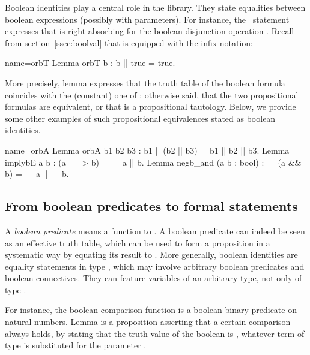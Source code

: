 Boolean identities play a central role in the \mcbMC{} library. They
state equalities between boolean expressions (possibly with parameters).
For
instance, the~ statement expresses that  is right absorbing
for the boolean disjunction operation . Recall from
section~\ref{ssec:boolval} that  is equipped with the \C{||}
infix notation:

\begin{coq}{name=orbT}{}
Lemma orbT b : b || true = true.
\end{coq}

More precisely, lemma 
expresses that the truth table of the boolean formula 
coincides with the (constant) one of : otherwise said, that the
two propositional formulas are equivalent, or that  is a
propositional tautology. Below, we provide some other examples of such
propositional equivalences stated as boolean identities.

\begin{coq}{name=orbA}{}
Lemma orbA b1 b2 b3 : b1 || (b2 || b3) = b1 || b2 || b3.
Lemma implybE a b : (a ==> b) = ~~ a || b.
Lemma negb_and (a b : bool) : ~~ (a && b) = ~~ a || ~~ b.
\end{coq}


\subsection{From boolean predicates to formal statements}
\label{sec:bstatements}

A \emph{boolean predicate} means a function to . A boolean
predicate can indeed be seen as an effective truth table, which can be
used to form a proposition in a systematic way by equating its result
to . More generally, boolean identities are equality statements
in type , which may involve arbitrary boolean predicates and boolean
connectives. They can feature variables of an arbitrary
type, not only of type .

For instance, the boolean comparison function
 is a boolean binary predicate on
natural numbers. Lemma  is a proposition asserting that a
certain comparison always holds, by stating that the truth value of
the boolean  is , whatever term  of type 
is substituted for the parameter .

